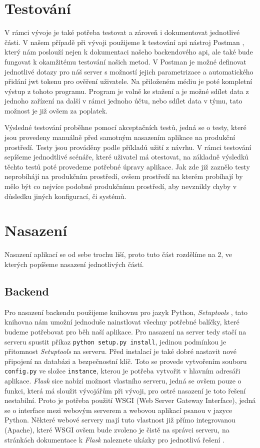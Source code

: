 \section{Testování}

V rámci vývoje je také potřeba testovat a zároveň i dokumentovat jednotlivé části. V našem případě při vývoji použijeme
k testování \gls{api} nástroj Postman \cite{postmanSW}, který nám poslouží nejen k dokumentaci našeho backendového \gls{api},
ale také bude fungovat k okamžitému testování našich metod. V Postman je možné definovat jednotlivé dotazy pro náš server s možností
jejich parametrizace a automatického přidání \gls{jwt} tokenu pro ověření uživatele. Na přiloženém médiu je poté kompletní výstup z
tohoto programu. Program je volně ke stažení a je možné sdílet data z jednoho zařízení na další v rámci jednoho účtu, nebo sdílet data
v týmu, tato možnost je již ovšem za poplatek.

Výsledné testování proběhne pomocí akceptačních testů, jedná se o testy,
které jsou provedeny manuálně před samotným nasazením aplikace na produkční prostředí. Testy jsou prováděny podle příkladů užití z návrhu.
V rámci testování sepíšeme jednodtlivé scénáře, které uživatel má otestovat, na základně výsledků těchto testů poté provedeme potřebné
úpravy aplikace. Jak zde již zaznělo testy neprobíhájí na produkčním prostředí, ovšem prostředí na kterém probíhají by mělo být co
nejvíce podobné produkčnímu prostředí, aby nevznikly chyby v důsledku jiných konfigurací, či systémů.

\section{Nasazení}

Nasazení aplikací se od sebe trochu liší, proto tuto část rozdělíme na 2, ve kterých popíšeme nasazení jednotlivých částí.

\subsection{Backend}

Pro nasazení backendu použijeme knihovnu pro jazyk Python, \textit{Setuptools} \cite{setupTools}, tato knihovna nám umožní
jednoduše nainstlovat všechny potřebné balíčky, které budeme potřebovat pro běh naší aplikace. Pro nasazení na server
tedy stačí na serveru spustit příkaz \texttt{python setup.py install}, jedinou podmínkou je přitomnost \textit{Setuptools}
na serveru. Před instalací je také dobré nastavit nové připojení na databázi a bezpečnostní klíč. Toto se provede vytvořením
souboru \texttt{config.py} ve složce \texttt{instance}, kterou je potřeba vytvořit v hlavním adresáři aplikace. \textit{Flask} sice nabízí možnost vlastního serveru, jedná se ovšem
pouze o funkci, která má sloužit vývojářům při vývoji, pro ostré nasazení je toto řešení nestabilní. Proto je potřeba použití WSGI (Web Server Gateway Interface), jedná se o interface
mezi webovým serverem a webovou aplikací psanou v jazyce Python. Některé webové servery mají tuto vlastnost již přímo integrovanou (Apache), které WSGI ovšem bude zvoleno
je čistě na správci serveru, na stránkách dokumentace k \textit{Flask} naleznete ukázky pro jednotlivá řešení \cite{flaskDeploy}.


